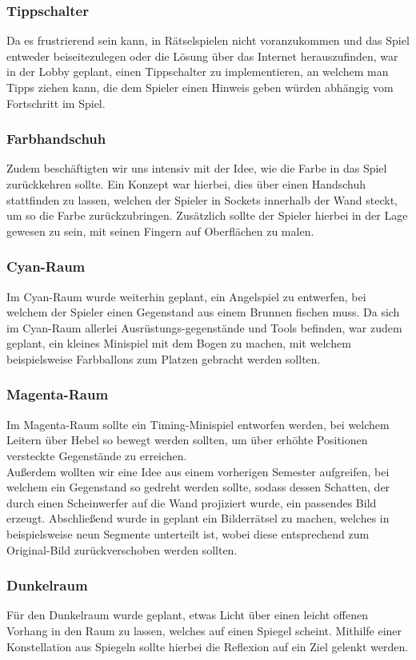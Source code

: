 \subsubsection{Tippschalter}
Da es frustrierend sein kann, in Rätselspielen nicht voranzukommen und das Spiel entweder beiseitezulegen oder die Lösung über das Internet herauszufinden, war in der Lobby geplant, einen Tippschalter zu implementieren, an welchem man Tipps ziehen kann, die dem Spieler einen Hinweis geben würden abhängig vom Fortschritt im Spiel.
\subsubsection{Farbhandschuh}
Zudem beschäftigten wir uns intensiv mit der Idee, wie die Farbe in das Spiel zurückkehren sollte. Ein Konzept war hierbei, dies über einen Handschuh stattfinden zu lassen, welchen der Spieler in Sockets innerhalb der Wand steckt, um so die Farbe zurückzubringen. Zusätzlich sollte der Spieler hierbei in der Lage gewesen zu sein, mit seinen Fingern auf Oberflächen zu malen.
\subsubsection{Cyan-Raum}
Im Cyan-Raum wurde weiterhin geplant, ein Angelspiel zu entwerfen, bei welchem der Spieler einen Gegenstand aus einem Brunnen fischen muss. 
Da sich im Cyan-Raum allerlei Ausrüstungs-gegenstände und Tools befinden, war zudem geplant, ein kleines Minispiel mit dem Bogen zu machen, mit welchem beispielsweise Farbballons zum Platzen gebracht werden sollten.
\subsubsection{Magenta-Raum}
Im Magenta-Raum sollte ein Timing-Minispiel entworfen werden, bei welchem Leitern über Hebel so bewegt werden sollten, um über erhöhte Positionen versteckte Gegenstände zu erreichen.\\
Außerdem wollten wir eine Idee aus einem vorherigen Semester aufgreifen, bei welchem ein Gegenstand so gedreht werden sollte, sodass dessen Schatten, der durch einen Scheinwerfer auf die Wand projiziert wurde, ein passendes Bild erzeugt. Abschließend wurde in geplant ein Bilderrätsel zu machen, welches in beispielsweise neun Segmente unterteilt ist, wobei diese entsprechend zum Original-Bild zurückverschoben werden sollten. 
\subsubsection{Dunkelraum}
Für den Dunkelraum wurde geplant, etwas Licht über einen leicht offenen Vorhang in den Raum zu lassen, welches auf einen Spiegel scheint. Mithilfe einer Konstellation aus Spiegeln sollte hierbei die Reflexion auf ein Ziel gelenkt werden.



